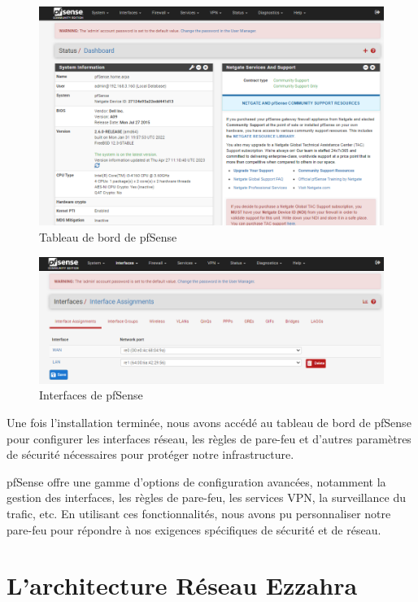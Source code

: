 \begin{figure}[H]
\centering
\includegraphics[width=15cm]{Images/BRadesMelian-Topologie14.png}
\caption{Tableau de bord de pfSense}
\label{Chap3.3.9}
\end{figure}

\begin{figure}[H]
\centering
\includegraphics[width=15cm]{Images/BRadesMelian-Topologie15.png}
\caption{Interfaces de pfSense}
\label{Chap3.3.10}
\end{figure}

Une fois l'installation terminée, nous avons accédé au tableau de bord de pfSense pour configurer les interfaces réseau, les règles de pare-feu et d'autres paramètres de sécurité nécessaires pour protéger notre infrastructure.

pfSense offre une gamme d'options de configuration avancées, notamment la gestion des interfaces, les règles de pare-feu, les services VPN, la surveillance du trafic, etc. En utilisant ces fonctionnalités, nous avons pu personnaliser notre pare-feu pour répondre à nos exigences spécifiques de sécurité et de réseau.


\section{L'architecture Réseau Ezzahra}


